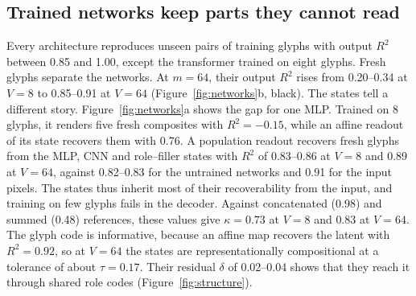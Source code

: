 \documentclass[10pt]{article}
\theoremstyle{plain}
\theoremstyle{remark}
\begin{document}
\subsection{Trained networks keep parts they cannot read}
\label{sec:networks}

Every architecture reproduces unseen pairs of training glyphs with output $R^2$ between 0.85 and 1.00, except the transformer trained on eight glyphs. Fresh glyphs separate the networks. At $m = 64$, their output $R^2$ rises from 0.20--0.34 at $V = 8$ to 0.85--0.91 at $V = 64$ (Figure~\ref{fig:networks}b, black). The states tell a different story. Figure~\ref{fig:networks}a shows the gap for one MLP. Trained on 8 glyphs, it renders five fresh composites with $R^2 = -0.15$, while an affine readout of its state recovers them with 0.76. A population readout recovers fresh glyphs from the MLP, CNN and role--filler states with $R^2$ of 0.83--0.86 at $V = 8$ and 0.89 at $V = 64$, against 0.82--0.83 for the untrained networks and 0.91 for the input pixels. The states thus inherit most of their recoverability from the input, and training on few glyphs fails in the decoder. Against concatenated (0.98) and summed (0.48) references, these values give $\kappa = 0.73$ at $V = 8$ and $0.83$ at $V = 64$. The glyph code is informative, because an affine map recovers the latent with $R^2 = 0.92$, so at $V = 64$ the states are representationally compositional at a tolerance of about $\tau = 0.17$. Their residual $\delta$ of 0.02--0.04 shows that they reach it through shared role codes (Figure~\ref{fig:structure}).
\end{document}
